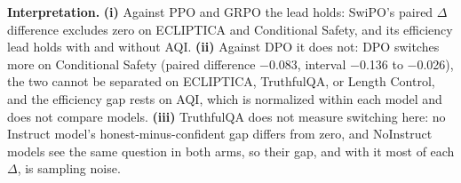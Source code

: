 \noindent\textbf{Interpretation.}
\textbf{(i)} Against \textsc{PPO} and \textsc{GRPO} the lead holds: SwiPO's paired $\Delta$ difference excludes zero on ECLIPTICA and Conditional Safety, and its efficiency lead holds with and without AQI.
\textbf{(ii)} Against \textsc{DPO} it does not: \textsc{DPO} switches more on Conditional Safety (paired difference $-$0.083, interval $-$0.136 to $-$0.026), the two cannot be separated on ECLIPTICA, TruthfulQA, or Length Control, and the efficiency gap rests on AQI, which is normalized within each model and does not compare models.
\textbf{(iii)} TruthfulQA does not measure switching here: no Instruct model's honest-minus-confident gap differs from zero, and NoInstruct models see the same question in both arms, so their gap, and with it most of each $\Delta$, is sampling noise.

